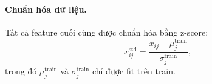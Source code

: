 \paragraph{Chuẩn hóa dữ liệu.}
Tất cả feature cuối cùng được chuẩn hóa bằng z-score:
\begin{equation}
    x_{ij}^{\mathrm{std}} =
    \frac{x_{ij} - \mu_j^{\mathrm{train}}}{\sigma_j^{\mathrm{train}}},
\end{equation}
trong đó $\mu_j^{\mathrm{train}}$ và $\sigma_j^{\mathrm{train}}$ chỉ được fit trên train.


